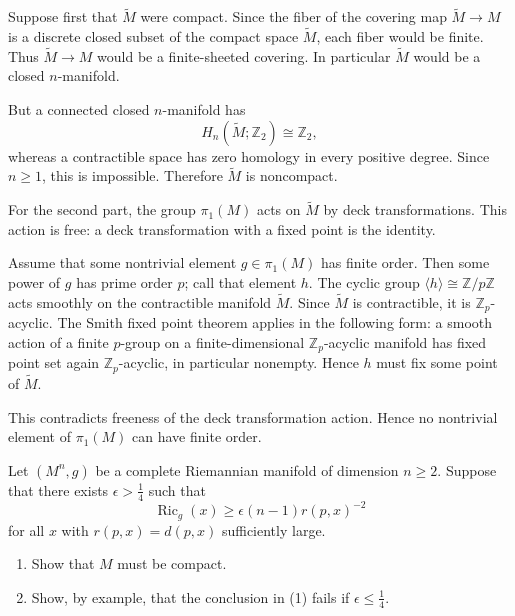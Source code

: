\begin{solution}
Suppose first that $\widetilde{M}$ were compact. Since the fiber of the covering
map $\widetilde{M}\to M$ is a discrete closed subset of the compact space
$\widetilde{M}$, each fiber would be finite. Thus $\widetilde{M}\to M$ would be a
finite-sheeted covering. In particular $\widetilde{M}$ would be a closed
$n$-manifold.

But a connected closed $n$-manifold has
\[
    H_n(\widetilde{M};\mathbb{Z}_2)\cong \mathbb{Z}_2,
\]
whereas a contractible space has zero homology in every positive degree. Since
$n\geq 1$, this is impossible. Therefore $\widetilde{M}$ is noncompact.

For the second part, the group $\pi_1(M)$ acts on $\widetilde{M}$ by deck
transformations. This action is free: a deck transformation with a fixed point is
the identity.

Assume that some nontrivial element $g\in\pi_1(M)$ has finite order. Then some
power of $g$ has prime order $p$; call that element $h$. The cyclic group
$\langle h\rangle\cong\mathbb{Z}/p\mathbb{Z}$ acts smoothly on the contractible
manifold $\widetilde{M}$. Since $\widetilde{M}$ is contractible, it is
$\mathbb{Z}_p$-acyclic. The Smith fixed point theorem applies in the following
form: a smooth action of a finite $p$-group on a finite-dimensional
$\mathbb{Z}_p$-acyclic manifold has fixed point set again
$\mathbb{Z}_p$-acyclic, in particular nonempty. Hence $h$ must fix some point of
$\widetilde{M}$.

This contradicts freeness of the deck transformation action. Hence no nontrivial
element of $\pi_1(M)$ can have finite order.
\end{solution}

\begin{exercise}
\label{geometry:2026:6}
Let $(M^n,g)$ be a complete Riemannian manifold of dimension $n\geq 2$. Suppose
that there exists $\epsilon>\frac{1}{4}$ such that
\[
    \operatorname{Ric}_g(x)\geq
    \epsilon(n-1)r(p,x)^{-2}
\]
for all $x$ with $r(p,x)=d(p,x)$ sufficiently large.
\begin{enumerate}
    \item Show that $M$ must be compact.
    \item Show, by example, that the conclusion in (1) fails if
    $\epsilon\leq \frac{1}{4}$.
\end{enumerate}
\end{exercise}

